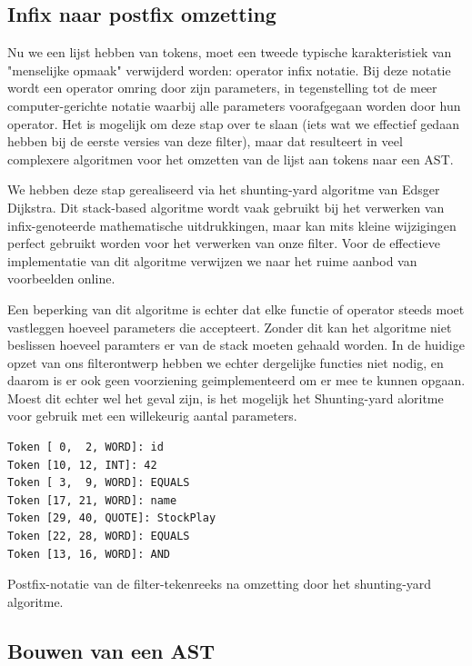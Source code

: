 \subsection{Infix naar postfix omzetting}

Nu we een lijst hebben van tokens, moet een tweede typische karakteristiek van "menselijke opmaak" verwijderd worden: operator infix notatie. Bij deze notatie wordt een operator omring door zijn parameters, in tegenstelling tot de meer computer-gerichte notatie waarbij alle parameters voorafgegaan worden door hun operator. Het is mogelijk om deze stap over te slaan (iets wat we effectief gedaan hebben bij de eerste versies van deze filter), maar dat resulteert in veel complexere algoritmen voor het omzetten van de lijst aan tokens naar een AST.

We hebben deze stap gerealiseerd via het shunting-yard algoritme van Edsger Dijkstra. Dit stack-based algoritme wordt vaak gebruikt bij het verwerken van infix-genoteerde mathematische uitdrukkingen, maar kan mits kleine wijzigingen perfect gebruikt worden voor het verwerken van onze filter. Voor de effectieve implementatie van dit algoritme verwijzen we naar het ruime aanbod van voorbeelden online.

Een beperking van dit algoritme is echter dat elke functie of operator steeds moet vastleggen hoeveel parameters die accepteert. Zonder dit kan het algoritme niet beslissen hoeveel paramters er van de stack moeten gehaald worden. In de huidige opzet van ons filterontwerp hebben we echter dergelijke functies niet nodig, en daarom is er ook geen voorziening geimplementeerd om er mee te kunnen opgaan. Moest dit echter wel het geval zijn, is het mogelijk het Shunting-yard aloritme  voor gebruik met een willekeurig aantal parameters.

\begin{code}
\begin{verbatim}
Token [ 0,  2, WORD]: id
Token [10, 12, INT]: 42
Token [ 3,  9, WORD]: EQUALS
Token [17, 21, WORD]: name
Token [29, 40, QUOTE]: StockPlay
Token [22, 28, WORD]: EQUALS
Token [13, 16, WORD]: AND
\end{verbatim}
\caption{Postfix-notatie van de filter-tekenreeks na omzetting door het shunting-yard algoritme.}
\end{code}

\subsection{Bouwen van een AST}

